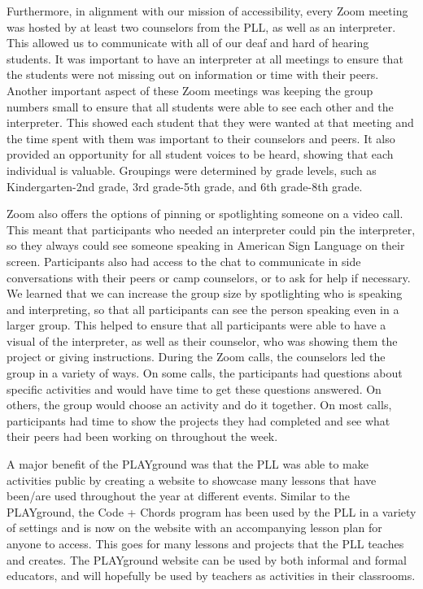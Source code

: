 \documentclass[11.5pt]{sig-alternate}
\begin{document}
\begin{large}
Furthermore, in alignment with our mission of accessibility, every Zoom meeting was hosted by at least two counselors from the PLL, as well as an interpreter. This allowed us to communicate with all of our deaf and hard of hearing students. It was important to have an interpreter at all meetings to ensure that the students were not missing out on information or time with their peers. Another important aspect of these Zoom meetings was keeping the group numbers small to ensure that all students were able to see each other and the interpreter. This showed each student that they were wanted at that meeting and the time spent with them was important to their counselors and peers. It also provided an opportunity for all student voices to be heard, showing that each individual is valuable. Groupings were determined by grade levels, such as Kindergarten-2nd grade, 3rd grade-5th grade, and 6th grade-8th grade.

Zoom also offers the options of pinning or spotlighting someone on a video call. This meant that participants who needed an interpreter could pin the interpreter, so they always could see someone speaking in American Sign Language on their screen. Participants also had access to the chat to communicate in side conversations with their peers or camp counselors, or to ask for help if necessary. We learned that we can increase the group size by spotlighting who is speaking and interpreting, so that all participants can see the person speaking even in a larger group. This helped to ensure that all participants were able to have a visual of the interpreter, as well as their counselor, who was showing them the project or giving instructions. During the Zoom calls, the counselors led the group in a variety of ways. On some calls, the participants had questions about specific activities and would have time to get these questions answered. On others, the group would choose an activity and do it together. On most calls, participants had time to show the projects they had completed and see what their peers had been working on throughout the week. 

A major benefit of the PLAYground was that the PLL was able to make activities public by creating a website to showcase many lessons that have been/are used throughout the year at different events. Similar to the PLAYground, the Code + Chords program has been used by the PLL in a variety of settings and is now on the website with an accompanying lesson plan for anyone to access. This goes for many lessons and projects that the PLL teaches and creates. The PLAYground website can be used by both informal and formal educators, and will hopefully be used by teachers as activities in their classrooms. 


\end{large}
\end{document}
